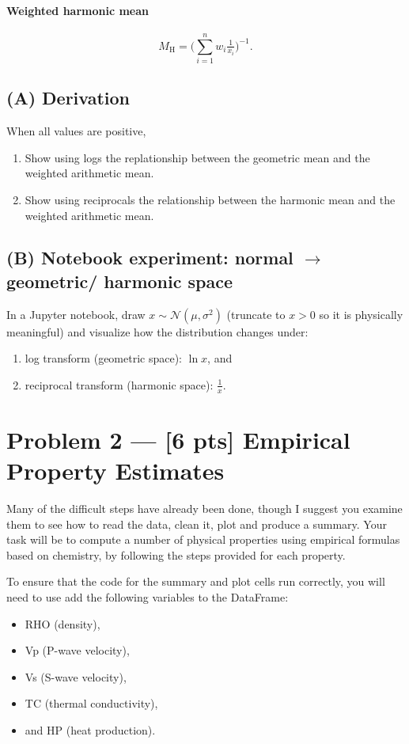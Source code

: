 \documentclass[11pt,a4paper]{article}
\newcommand{\geom}{\mathrm{G}}
\newcommand{\harm}{\mathrm{H}}
\begin{document}
\paragraph{Weighted harmonic mean}
\[
    M_{\harm} = \Big(\sum_{i=1}^n w_i \tfrac{1}{x_i}\Big)^{-1}.
\]

\subsection*{(A) Derivation}
When all values are positive,
\begin{enumerate}[label=\textbf{\alph*.}]
    \item Show using logs the replationship between the geometric mean and the weighted arithmetic mean.
    \item Show using reciprocals the relationship between the harmonic mean and the weighted arithmetic mean.
\end{enumerate}


\subsection*{(B) Notebook experiment: normal $\to$ geometric/ harmonic space}
In a Jupyter notebook, draw $x \sim \mathcal N(\mu,\sigma^2)$ (truncate to $x>0$ so it is physically meaningful) and visualize how the distribution changes under:
\begin{enumerate}[itemsep=0.1em]
  \item log transform (geometric space): \(\ln x\), and
  \item reciprocal transform (harmonic space): \(\tfrac{1}{x}\).
\end{enumerate}


\section*{Problem 2 --- [6 pts] Empirical Property Estimates}
Many of the difficult steps have already been done, though I suggest you examine them to see how to read the data, clean it, plot and produce a summary.  Your task will be to compute a number of physical properties using empirical formulas based on chemistry, by following the steps provided for each property.

To ensure that the code for the summary and plot cells run correctly, you will need to use add the following variables to the DataFrame:
\begin{itemize}[itemsep=0.1em]
  \item RHO (density),
  \item Vp (P-wave velocity),
  \item Vs (S-wave velocity),
  \item TC (thermal conductivity),
  \item and HP (heat production).
\end{itemize}
\end{document}
